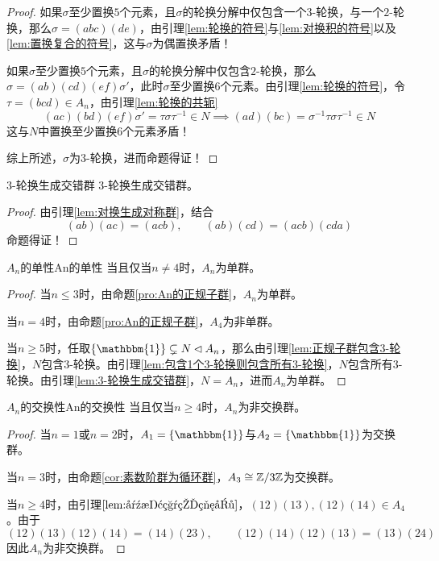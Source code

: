 \begin{proof}
	如果$\sigma$至少置换$5$个元素，且$\sigma$的轮换分解中仅包含一个$3$-轮换，与一个$2$-轮换，那么$\sigma=(abc)(de)$，由引理\ref{lem:轮换的符号}与\ref{lem:对换积的符号}以及\ref{lem:置换复合的符号}，这与$\sigma$为偶置换矛盾！
	
	如果$\sigma$至少置换$5$个元素，且$\sigma$的轮换分解中仅包含$2$-轮换，那么$\sigma=(ab)(cd)(ef)\sigma'$，此时$\sigma$至少置换$6$个元素。由引理\ref{lem:轮换的符号}，令$\tau=(bcd)\in A_n$，由引理\ref{lem:轮换的共轭}
	$$
	(ac)(bd)(ef)\sigma'=\tau\sigma\tau^{-1}\in N\implies (ad)(bc)=\sigma^{-1}\tau\sigma\tau^{-1}\in N
	$$
	这与$N$中置换至少置换$6$个元素矛盾！
	
	综上所述，$\sigma$为$3$-轮换，进而命题得证！
\end{proof}

\begin{lemma}{}{3-轮换生成交错群}
	$3$-轮换生成交错群。
\end{lemma}

\begin{proof}
	由引理\ref{lem:对换生成对称群}，结合
	$$
	(ab)(ac)=(acb),\qquad
	(ab)(cd)=(acb)(cda)
	$$
	命题得证！
\end{proof}

\begin{theorem}{$A_n$的单性}{An的单性}
	当且仅当$n\ne 4$时，$A_n$为单群。
\end{theorem}

\begin{proof}
	当$n\le 3$时，由命题\ref{pro:An的正规子群}，$A_n$为单群。
	
	当$n=4$时，由命题\ref{pro:An的正规子群}，$A_4$为非单群。
	
	当$n\ge 5$时，任取$\{\mathbbm{1}\}\subsetneq N\lhd A_n$，那么由引理\ref{lem:正规子群包含3-轮换}，$N$包含$3$-轮换。由引理\ref{lem:包含1个3-轮换则包含所有3-轮换}，$N$包含所有$3$-轮换。由引理\ref{lem:3-轮换生成交错群}，$N=A_n$，进而$A_n$为单群。
\end{proof}

\begin{proposition}{$A_n$的交换性}{An的交换性}
	当且仅当$n\ge 4$时，$A_n$为非交换群。
\end{proposition}

\begin{proof}
	当$n=1$或$n=2$时，$A_1=\{\mathbbm{1}\}$与$A_2=\{\mathbbm{1}\}$为交换群。
	
	当$n=3$时，由命题\ref{cor:素数阶群为循环群}，$A_3\cong\mathbb{Z}/3\mathbb{Z}$为交换群。
	
	当$n\ge 4$时，由引理$\ref{lem:对换积的符号}$，$(12)(13),(12)(14)\in A_4$。由于
	$$
	(12)(13)(12)(14)=(14)(23),\qquad 
	(12)(14)(12)(13)=(13)(24)
	$$
	因此$A_n$为非交换群。
\end{proof}

